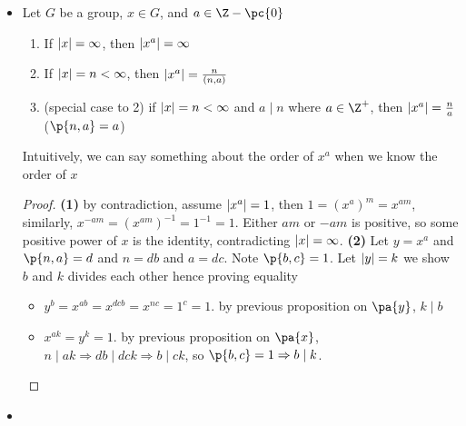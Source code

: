 \documentclass[11pt]{article}
\begin{document}
\begin{definition*}
\begin{itemize}
\begin{proof}
\begin{itemize}
            \end{itemize}
            \textbf{(infinite case)} If $\pa{x}$ is an infinite cyclic group, show $\varphi$ is an isomorphism 
            \begin{align*}
                \varphi: \Z &\to \pa{x} \\
                k   & \mapsto x^k 
            \end{align*}
            \begin{itemize}
                \item (well-defined) no ambiguity on $\Z$
                \item (homomorphism) by law of exponent
                \item (bijection) $\varphi$ surjective by definition of cyclic group. $\varphi$ injective by previous proposition, i.e. $x^a\neq x^b$ for all distinct $a, b\in \Z$.
            \end{itemize}
        \end{proof}
        \item {} Let $G$ be a group, $x\in G$, and $a\in \Z - \pc{0}$
        \begin{enumerate}
            \item If $\left|x\right|=\infty$, then $\left|x^a\right|=\infty$
            \item If $\left|x\right|=n<\infty$, then $\left|x^a\right| = \frac{n}{(n,a)}$
            \item (special case to 2) if $\left|x\right|=n<\infty$ and $a \mid n$ where $a\in\Z^+$, then $\left|x^a\right| = \frac{n}{a}$ ($\p{n,a}=a$)
        \end{enumerate}
        Intuitively, we can say something about the order of $x^a$ when we know the order of $x$
        \begin{proof}
            \textbf{(1)} by contradiction, assume $\left|x^a\right|=1$, then $1 = (x^a)^m = x^{am}$, similarly, $x^{-am} = (x^{am})^{-1} = 1^{-1} = 1$. Either $am$ or $-am$ is positive, so some positive power of $x$ is the identity, contradicting $\left|x\right| =\infty$. \textbf{(2)} Let $y=x^a$ and $\p{n,a}=d$ and $n=db$ and $a=dc$. Note $\p{b,c}=1$. Let $\left|y\right|=k$ we show $b$ and $k$ divides each other hence proving equality
            \begin{itemize}
                \item {} $y^b = x^{ab} = x^{dcb} = x^{nc} = 1^c = 1$. by previous proposition on $\pa{y}$, $k \mid b$
                \item {} $x^{ak}=y^k=1$. by previous proposition on $\pa{x}$, $n\mid ak \Rightarrow db \mid dck \Rightarrow b\mid ck$, so $\p{b,c}=1 \Rightarrow b\mid k$.
            \end{itemize}
        \end{proof}
        \item {} 
    \end{itemize}
\end{definition*}
 
\end{document}

